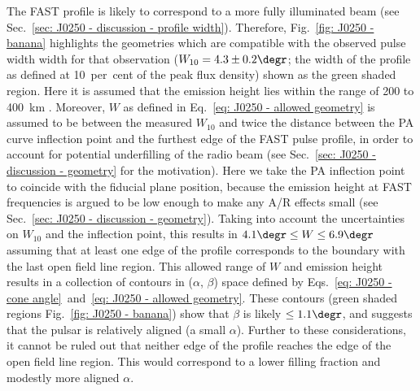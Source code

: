 The FAST profile is likely to correspond to a more fully illuminated beam (see Sec.~\ref{sec: J0250 - discussion - profile width}). Therefore, Fig.~\ref{fig: J0250 - banana} highlights the geometries which are compatible with the observed pulse width width for that observation ($W_{10}=4.3\pm0.2\degr$; the width of the profile as defined at 10~per~cent of the peak flux density) shown as the green shaded region. Here it is assumed that the emission height lies within the range of 200 to 400~km \citep[e.g.][]{MRxx2002, JKxx2019}. Moreover, $W$ as defined in Eq.~\eqref{eq: J0250 - allowed geometry} is assumed to be between the measured $W_{10}$ and twice the distance between the PA curve inflection point and the furthest edge of the FAST pulse profile, in order to account for potential underfilling of the radio beam (see Sec.~\ref{sec: J0250 - discussion - geometry} for the motivation). Here we take the PA inflection point to coincide with the fiducial plane position, because the emission height at FAST frequencies is argued to be low enough to make any A/R effects small (see Sec.~\ref{sec: J0250 - discussion - geometry}). Taking into account the uncertainties on $W_{10}$ and the inflection point, this results in $4.1\degr \leq W \leq 6.9\degr$ assuming that at least one edge of the profile corresponds to the boundary with the last open field line region. This allowed range of $W$ and emission height results in a collection of contours in ($\alpha$, $\beta$) space defined by Eqs.~\eqref{eq: J0250 - cone angle}~and~\eqref{eq: J0250 - allowed geometry}. These contours (green shaded regions Fig.~\ref{fig: J0250 - banana}) show that $\beta$ is likely $\leq1.1\degr$, and suggests that the pulsar is relatively aligned (a small $\alpha$). Further to these considerations, it cannot be ruled out that neither edge of the profile reaches the edge of the open field line region. This would correspond to a lower filling fraction and modestly more aligned $\alpha$. 



